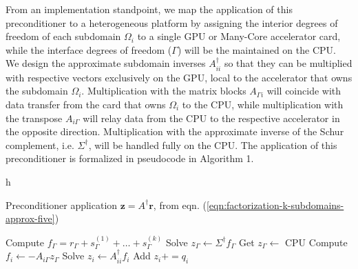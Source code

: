 From an implementation standpoint, we map the application of this preconditioner to a heterogeneous platform by assigning the interior degrees of freedom of each
subdomain $\Omega_i$ to a single GPU or Many-Core accelerator card, while the interface degrees of freedom ($\Gamma$) will be the maintained on the CPU. We design
the approximate subdomain inverses $A_{ii}^\dagger$ so that they can be multiplied with respective vectors exclusively on the GPU, local to the accelerator that owns
the subdomain $\Omega_i$. Multiplication with the matrix blocks $A_{\Gamma i}$ will coincide with data transfer from the card that owns $\Omega_i$ to the CPU, while
multiplication with the transpose $A_{i\Gamma}$ will relay data from the CPU to the respective accelerator in the opposite direction. Multiplication with the
approximate inverse of the Schur complement, i.e. $\Sigma^\dagger$, will be handled fully on the CPU. The application of this preconditioner is formalized in
pseudocode in Algorithm 1.  


\begin{algorithm}{h}
\caption{Preconditioner application $\boldsymbol{z}=A^\dagger\boldsymbol{r}$, from eqn. (\ref{eqn:factorization-k-subdomains-approx-five})}
\label{alg:apply-preconditioner}
\begin{algorithmic}[1]
\STATE{}
\ENDFOR
\STATE Compute $f_\Gamma=r_\Gamma+s_\Gamma^{(1)}+\ldots+s_\Gamma^{(k)}$
\STATE Solve $z_\Gamma\leftarrow\Sigma^\dagger f_\Gamma$
\STATE{}
\STATE Get $z_\Gamma\leftarrow$ CPU
\STATE Compute $f_i\leftarrow -A_{i\Gamma}z_\Gamma$
\STATE Solve $z_i\leftarrow A_{ii}^\dagger f_i$
\STATE Add $z_i+=q_i$
\ENDFOR
\end{algorithmic}
\end{algorithm}

